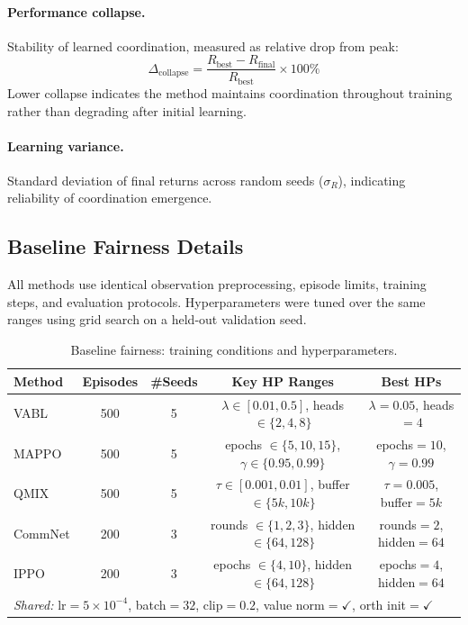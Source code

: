 \documentclass{article}
\theoremstyle{plain}
\theoremstyle{definition}
\theoremstyle{remark}
\begin{document}
\paragraph{Performance collapse.} Stability of learned coordination, measured as relative drop from peak:
\begin{equation}
\Delta_{\mathrm{collapse}} = \frac{R_{\mathrm{best}} - R_{\mathrm{final}}}{R_{\mathrm{best}}} \times 100\%
\end{equation}
Lower collapse indicates the method maintains coordination throughout training rather than degrading after initial learning.

\paragraph{Learning variance.} Standard deviation of final returns across random seeds ($\sigma_R$), indicating reliability of coordination emergence.

\subsection{Baseline Fairness Details}
\label{app:baseline_fairness}

All methods use identical observation preprocessing, episode limits, training steps, and evaluation protocols. Hyperparameters were tuned over the same ranges using grid search on a held-out validation seed.

\begin{table}[h]
\centering
\caption{Baseline fairness: training conditions and hyperparameters.}
\begin{tabular}{lcccc}
\toprule
\textbf{Method} & \textbf{Episodes} & \textbf{\#Seeds} & \textbf{Key HP Ranges} & \textbf{Best HPs} \\
\midrule
VABL & 500 & 5 & $\lambda \in [0.01, 0.5]$, heads $\in \{2,4,8\}$ & $\lambda=0.05$, heads$=4$ \\
MAPPO & 500 & 5 & epochs $\in \{5,10,15\}$, $\gamma \in \{0.95,0.99\}$ & epochs$=10$, $\gamma=0.99$ \\
QMIX & 500 & 5 & $\tau \in [0.001, 0.01]$, buffer $\in \{5k,10k\}$ & $\tau=0.005$, buffer$=5k$ \\
CommNet & 200 & 3 & rounds $\in \{1,2,3\}$, hidden $\in \{64,128\}$ & rounds$=2$, hidden$=64$ \\
IPPO & 200 & 3 & epochs $\in \{4,10\}$, hidden $\in \{64,128\}$ & epochs$=4$, hidden$=64$ \\
\midrule
\multicolumn{5}{l}{\footnotesize \textit{Shared:} lr$=5\times10^{-4}$, batch$=32$, clip$=0.2$, value norm$=\checkmark$, orth init$=\checkmark$} \\
\bottomrule
\end{tabular}
\end{table}
\end{document}
